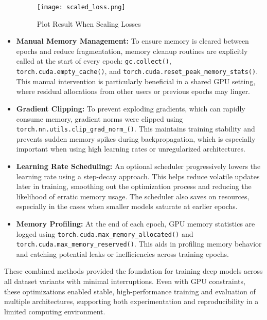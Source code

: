 \begin{itemize}
    \begin{figure}[H]
        \centering
        \texttt{[image: scaled\_loss.png]}
        \caption{Plot Result When Scaling Losses}
        \label{fig:scaled_loss}
    \end{figure}


    \item \textbf{Manual Memory Management:} To ensure memory is cleared between epochs and reduce fragmentation, memory cleanup routines are explicitly called at the start of every epoch: \texttt{gc.collect()}, \texttt{torch.cuda.empty\_cache()}, and \texttt{torch.cuda.reset\_peak\_memory\_stats()}. This manual intervention is particularly beneficial in a shared GPU setting, where residual allocations from other users or previous epochs may linger.

    \item \textbf{Gradient Clipping:} To prevent exploding gradients, which can rapidly consume memory, gradient norms were clipped using \texttt{torch.nn.utils.clip\_grad\_norm\_()}. This maintains training stability and prevents sudden memory spikes during backpropagation, which is especially important when using high learning rates or unregularized architectures.

    \item \textbf{Learning Rate Scheduling:} An optional scheduler progressively lowers the learning rate using a step-decay approach. This helps reduce volatile updates later in training, smoothing out the optimization process and reducing the likelihood of erratic memory usage. The scheduler also saves on resources, especially in the cases when smaller models saturate at earlier epochs.

    \item \textbf{Memory Profiling:} At the end of each epoch, GPU memory statistics are logged using \texttt{torch.cuda.max\_memory\_allocated()} and \texttt{torch.cuda.max\_memory\_reserved()}. This aids in profiling memory behavior and catching potential leaks or inefficiencies across training epochs. 
\end{itemize}

These combined methods provided the foundation for training deep models across all dataset variants with minimal interruptions. Even with GPU constraints, these optimizations enabled stable, high-performance training and evaluation of multiple architectures, supporting both experimentation and reproducibility in a limited computing environment.
